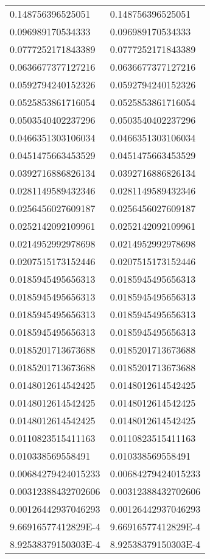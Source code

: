 \documentclass[12pt]{article}
\begin{document}
\begin{tabular}{l l}0.148756396525051	&	0.148756396525051\\
0.096989170534333	&	0.096989170534333\\
0.0777252171843389	&	0.0777252171843389\\
0.0636677377127216	&	0.0636677377127216\\
0.0592794240152326	&	0.0592794240152326\\
0.0525853861716054	&	0.0525853861716054\\
0.0503540402237296	&	0.0503540402237296\\
0.0466351303106034	&	0.0466351303106034\\
0.0451475663453529	&	0.0451475663453529\\
0.0392716886826134	&	0.0392716886826134\\
0.0281149589432346	&	0.0281149589432346\\
0.0256456027609187	&	0.0256456027609187\\
0.0252142092109961	&	0.0252142092109961\\
0.0214952992978698	&	0.0214952992978698\\
0.0207515173152446	&	0.0207515173152446\\
0.0185945495656313	&	0.0185945495656313\\
0.0185945495656313	&	0.0185945495656313\\
0.0185945495656313	&	0.0185945495656313\\
0.0185945495656313	&	0.0185945495656313\\
0.0185201713673688	&	0.0185201713673688\\
0.0185201713673688	&	0.0185201713673688\\
0.0148012614542425	&	0.0148012614542425\\
0.0148012614542425	&	0.0148012614542425\\
0.0148012614542425	&	0.0148012614542425\\
0.0110823515411163	&	0.0110823515411163\\
0.010338569558491	&	0.010338569558491\\
0.00684279424015233	&	0.00684279424015233\\
0.00312388432702606	&	0.00312388432702606\\
0.00126442937046293	&	0.00126442937046293\\
9.66916577412829E-4	&	9.66916577412829E-4\\
8.92538379150303E-4	&	8.92538379150303E-4\\

\end{tabular}
\end{document}
